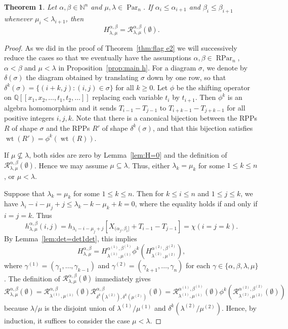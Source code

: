 \documentclass[12pt]{amsart}
\numberwithin{equation}{section}
\newtheorem{thm}{Theorem}[section]
\theoremstyle{definition}
\newcommand\NN{\mathbb{N}}
\newcommand\Par{\operatorname{Par}}
\newcommand\RPar{\operatorname{RPar}}
\newcommand\lm{{\lambda/\mu}}
\newcommand\wt{\operatorname{wt}}
\newcommand\R{\mathcal{R}}
\begin{document}
\begin{thm}\label{thm:flag h2}
  Let $\alpha,\beta\in\NN^n$ and $\mu,\lambda\in\Par_n$. 
If
  $\alpha_i\le \alpha_{i+1}$ and $\beta_i\le \beta_{i+1}$ whenever
  $\mu_i<\lambda_{i+1}$, then
\[
H_{\lambda,\mu}^{\alpha,\beta} = \R_{\lambda,\mu}^{\alpha,\beta}(\emptyset).
\]
\end{thm}
\begin{proof}
  As we did in the proof of Theorem~\ref{thm:flag e2} we will successively
  reduce the cases so that we eventually have the assumptions
  $\alpha,\beta\in\RPar_n$, $\alpha<\beta$ and $\mu<\lambda$ in
  Proposition~\ref{prop:main h}. For a diagram $\sigma$, we denote by
  $\delta(\sigma)$ the diagram obtained by translating $\sigma$ down by one row,
  so that $\delta^k(\sigma)=\{(i+k,j): (i,j)\in \sigma\}$ for all $k\ge0$. Let
  $\phi$ be the shifting operator on $\mathbb{Q}[[x_1,x_2,\dots,t_1,t_2,\dots]]$
  replacing each variable $t_i$ by $t_{i+1}$. Then $\phi^k$ is an algebra
  homomorphism and it sends $T_{i-1} - T_{j-1}$ to $T_{i+k-1} - T_{j+k-1}$ for
  all positive integers $i, j, k$. Note that there is a canonical bijection
  between the RPPs $R$ of shape $\sigma$ and the RPPs $R'$ of shape
  $\delta^k(\sigma)$, and that this bijection satisfies $ \wt(R') =
  \phi^k(\wt(R))$.

  If $\mu\not\subseteq\lambda$, both sides are zero by Lemma~\ref{lem:H=0} and
  the definition of $\R_{\lambda,\mu}^{\alpha,\beta}(\emptyset)$. Hence we may
  assume $\mu\subseteq\lambda$. Thus, either $\lambda_k = \mu_k$ for some $1 \le
  k \le n$, or $\mu < \lambda$.

  Suppose that $\lambda_k=\mu_k$ for some $1\le k\le n$. Then for $k\le i\le n$
  and $1\le j\le k$, we have $\lambda_i-i-\mu_j+j\le \lambda_k-k-\mu_k+k=0$,
  where the equality holds if and only if $i=j=k$. Thus
  \[
    h^{\alpha,\beta}_{\lambda,\mu}(i,j) =
    h_{\lambda_i-i-\mu_j+j}[X_{(\alpha_j,\beta_i]}+T_{i-1}-T_{j-1}] = \chi(i=j=k).
  \]
  By Lemma~\ref{lem:det=det1det}, this implies
  \[
    H_{\lambda,\mu}^{\alpha,\beta} = H_{\lambda^{(1)},\mu^{(1)}}^{\alpha^{(1)},\beta^{(1)}}
    \phi^k\left(H_{\lambda^{(2)},\mu^{(2)}}^{\alpha^{(2)},\beta^{(2)}}\right),
  \]
  where $\gamma^{(1)}=(\gamma_1,\dots,\gamma_{k-1})$ and
  $\gamma^{(2)}=(\gamma_{k+1},\dots,\gamma_{n})$ for each
  $\gamma\in\{\alpha,\beta,\lambda,\mu\}$. The definition of
  $\R_{\lambda,\mu}^{\alpha,\beta}(\emptyset)$ immediately gives
  \[
    \R_{\lambda,\mu}^{\alpha,\beta}(\emptyset) =
    \R_{\lambda^{(1)},\mu^{(1)}}^{\alpha,\beta}(\emptyset)
    \R_{\delta^k(\lambda^{(2)}),\delta^k(\mu^{(2)})}^{\alpha,\beta}(\emptyset)
    =\R_{\lambda^{(1)},\mu^{(1)}}^{\alpha^{(1)},\beta^{(1)}}(\emptyset)
    \phi^k\left(\R_{\lambda^{(2)},\mu^{(2)}}^{\alpha^{(2)},\beta^{(2)}}(\emptyset)\right)
  \]
  because $\lm$ is the disjoint union of $\lambda^{(1)}/\mu^{(1)}$ and
  $\delta^k(\lambda^{(2)}/\mu^{(2)})$. Hence, by induction, it suffices to
  consider the case $\mu<\lambda$.


\end{proof}
\end{document}
